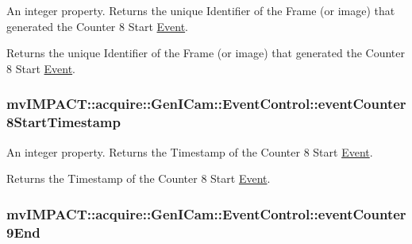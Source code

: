 An integer property. Returns the unique Identifier of the Frame (or image) that generated the Counter 8 Start \hyperlink{classmv_i_m_p_a_c_t_1_1acquire_1_1_event}{Event}. 

Returns the unique Identifier of the Frame (or image) that generated the Counter 8 Start \hyperlink{classmv_i_m_p_a_c_t_1_1acquire_1_1_event}{Event}. \hypertarget{classmv_i_m_p_a_c_t_1_1acquire_1_1_gen_i_cam_1_1_event_control_a904b27d7e8ef9024e3ad96eb91c52477}{
\subsubsection[{event\+Counter8\+Start\+Timestamp}]{ mv\+I\+M\+P\+A\+C\+T\+::acquire\+::\+Gen\+I\+Cam\+::\+Event\+Control\+::event\+Counter8\+Start\+Timestamp}}\label{classmv_i_m_p_a_c_t_1_1acquire_1_1_gen_i_cam_1_1_event_control_a904b27d7e8ef9024e3ad96eb91c52477}


An integer property. Returns the Timestamp of the Counter 8 Start \hyperlink{classmv_i_m_p_a_c_t_1_1acquire_1_1_event}{Event}. 

Returns the Timestamp of the Counter 8 Start \hyperlink{classmv_i_m_p_a_c_t_1_1acquire_1_1_event}{Event}. \hypertarget{classmv_i_m_p_a_c_t_1_1acquire_1_1_gen_i_cam_1_1_event_control_ae3e1133cd101d5726c476dfb6684936f}{
\subsubsection[{event\+Counter9\+End}]{ mv\+I\+M\+P\+A\+C\+T\+::acquire\+::\+Gen\+I\+Cam\+::\+Event\+Control\+::event\+Counter9\+End}}\label{classmv_i_m_p_a_c_t_1_1acquire_1_1_gen_i_cam_1_1_event_control_ae3e1133cd101d5726c476dfb6684936f}


